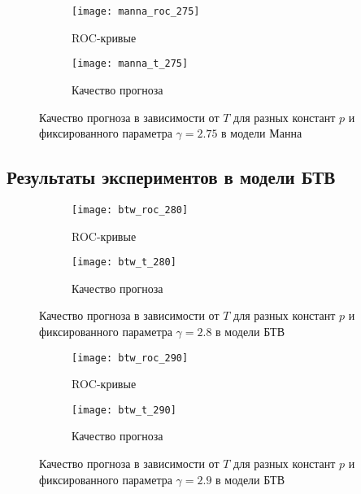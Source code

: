 \begin{figure}[h]
	\centering
	\hspace{-20mm}
	\begin{subfigure}[t]{0.4\textwidth}
		\texttt{[image: manna\_roc\_275]} 
		\caption{ROC-кривые}
	\end{subfigure}
	\hspace*{10mm}
	\begin{subfigure}[t]{0.4\textwidth}
		\texttt{[image: manna\_t\_275]} 
		\caption{Качество прогноза}
	\end{subfigure}
	\caption{Качество прогноза в зависимости от $T$ для разных констант $p$ и фиксированного параметра $\gamma=2.75$ в модели Манна}
\end{figure}

\newpage
\clearpage

\subsection{Результаты экспериментов в модели БТВ}\label{appendix:b}

\begin{figure}[h]
	\centering
	\hspace{-20mm}
	\begin{subfigure}[t]{0.4\textwidth}
		\texttt{[image: btw\_roc\_280]} 
		\caption{ROC-кривые}
	\end{subfigure}
	\hspace*{10mm}
	\begin{subfigure}[t]{0.4\textwidth}
		\texttt{[image: btw\_t\_280]} 
		\caption{Качество прогноза}
	\end{subfigure}
	\caption{Качество прогноза в зависимости от $T$ для разных констант $p$ и фиксированного параметра $\gamma=2.8$ в модели БТВ}
\end{figure}

\begin{figure}[h]
	\centering
	\hspace{-20mm}
	\begin{subfigure}[t]{0.4\textwidth}
		\texttt{[image: btw\_roc\_290]} 
		\caption{ROC-кривые}
	\end{subfigure}
	\hspace*{10mm}
	\begin{subfigure}[t]{0.4\textwidth}
		\texttt{[image: btw\_t\_290]} 
		\caption{Качество прогноза}
	\end{subfigure}
	\caption{Качество прогноза в зависимости от $T$ для разных констант $p$ и фиксированного параметра $\gamma=2.9$ в модели БТВ}
\end{figure}


